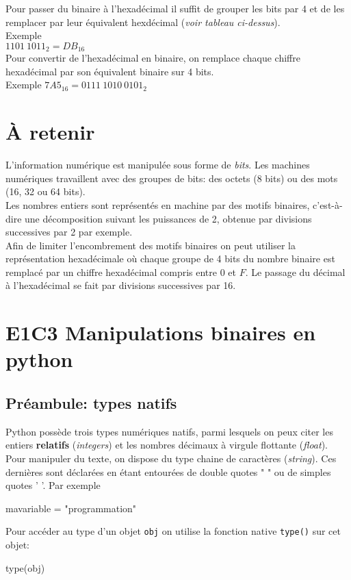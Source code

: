 \documentclass[11pt, french]{article}
\newenvironment{Shaded}{}{}
\newcommand{\StringTok}[1]{\textcolor[rgb]{0.25,0.44,0.63}{{#1}}}
\newcommand{\NormalTok}[1]{{#1}}
\newcommand{\OperatorTok}[1]{\textcolor[rgb]{0.40,0.40,0.40}{{#1}}}
\begin{document}
Pour passer du binaire à l'hexadécimal il suffit de grouper les bits par
4 et de les remplacer par leur équivalent hexdécimal (\emph{voir tableau
ci-dessus}).\\
Exemple\\
\(1101\ 1011_2 = DB_{16}\)\\
Pour convertir de l'hexadécimal en binaire, on remplace chaque chiffre
hexadécimal par son équivalent binaire sur 4 bits.\\
Exemple \(7A5_{16}= 0111\ 1010\ 0101_2\)

    \hypertarget{uxe0-retenir}{%
\section{À retenir}\label{uxe0-retenir}}

L'information numérique est manipulée sous forme de \emph{bits}. Les
machines numériques travaillent avec des groupes de bits: des octets (8
bits) ou des mots (16, 32 ou 64 bits).\\
Les nombres entiers sont représentés en machine par des motifs binaires,
c'est-à-dire une décomposition suivant les puissances de 2, obtenue par
divisions successives par 2 par exemple.\\
Afin de limiter l'encombrement des motifs binaires on peut utiliser la
représentation hexadécimale où chaque groupe de 4 bits du nombre binaire
est remplacé par un chiffre hexadécimal compris entre 0 et \(F\). Le
passage du décimal à l'hexadécimal se fait par divisions successives par
16.

    \hypertarget{e1c3-manipulations-binaires-en-python}{%
\section{E1C3 Manipulations binaires en
python}\label{e1c3-manipulations-binaires-en-python}}

\hypertarget{a.-pruxe9ambule-types-natifs}{%
\subsection{Préambule: types
natifs}\label{a.-pruxe9ambule-types-natifs}}

Python possède trois types numériques natifs, parmi lesquels on peux
citer les entiers \textbf{relatifs} (\emph{integers}) et les nombres
décimaux à virgule flottante (\emph{float}). Pour manipuler du texte, on
dispose du type chaine de caractères (\emph{string}). Ces dernières sont
déclarées en étant entourées de double quotes " " ou de simples quotes '
'. Par exemple
\begin{Shaded}
\begin{Highlighting}[]
\NormalTok{mavariable }\OperatorTok{=} \StringTok{"programmation"}
\end{Highlighting}
Pour accéder au type d'un objet \texttt{obj} on utilise la fonction native \texttt{type()} sur cet objet: 
\begin{Highlighting}[]
\StringTok{type(obj)}
\end{Highlighting}
\end{Shaded}
\end{document}
